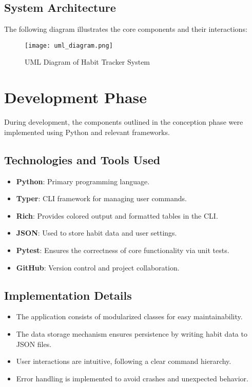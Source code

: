 \documentclass[a4paper,12pt]{article}
\begin{document}
\subsection{System Architecture}
The following diagram illustrates the core components and their interactions:

\begin{figure}[h]
    \centering
    \texttt{[image: uml\_diagram.png]} %
    \caption{UML Diagram of Habit Tracker System}
    \label{fig:uml}
\end{figure}

\section{Development Phase}
During development, the components outlined in the conception phase were implemented using Python and relevant frameworks.

\subsection{Technologies and Tools Used}
\begin{itemize}
    \item \textbf{Python}: Primary programming language.
    \item \textbf{Typer}: CLI framework for managing user commands.
    \item \textbf{Rich}: Provides colored output and formatted tables in the CLI.
    \item \textbf{JSON}: Used to store habit data and user settings.
    \item \textbf{Pytest}: Ensures the correctness of core functionality via unit tests.
    \item \textbf{GitHub}: Version control and project collaboration.
\end{itemize}

\subsection{Implementation Details}
\begin{itemize}
    \item The application consists of modularized classes for easy maintainability.
    \item The data storage mechanism ensures persistence by writing habit data to JSON files.
    \item User interactions are intuitive, following a clear command hierarchy.
    \item Error handling is implemented to avoid crashes and unexpected behavior.
\end{itemize}
\end{document}
